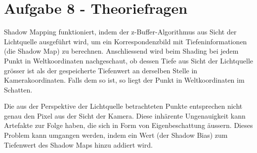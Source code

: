 \documentclass{article} %
\begin{document}
\section*{Aufgabe 8 - Theoriefragen}

Shadow Mapping funktioniert, indem der z-Buffer-Algorithmus aus Sicht der Lichtquelle ausgeführt wird, um ein Korrespondenzbild mit Tiefeninformationen (die Shadow Map) zu berechnen. Anschliessend wird beim Shading bei jedem Punkt in Weltkoordinaten nachgeschaut, ob dessen Tiefe aus Sicht der Lichtquelle grösser ist als der gespeicherte Tiefenwert an derselben Stelle in Kamerakoordinaten. Falls dem so ist, so liegt der Punkt in Weltkoordinaten im Schatten.

Die aus der Perspektive der Lichtquelle betrachteten Punkte entsprechen nicht genau den Pixel aus der Sicht der Kamera. Diese inhärente Ungenauigkeit kann Artefakte zur Folge haben, die sich in Form von Eigenbeschattung äussern. Dieses Problem kann umgangen werden, indem ein Wert (der Shadow Bias) zum Tiefenwert des Shadow Maps hinzu addiert wird.
\end{document}
